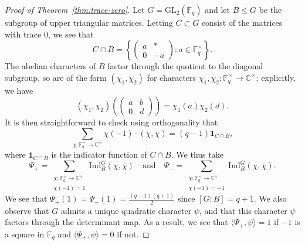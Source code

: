 \documentclass[12pt]{amsart}
\theoremstyle{definition} \newtheorem{definition}[theorem]{Definition}
\theoremstyle{example} \newtheorem{example}[theorem]{Example}
\theoremstyle{remark} \newtheorem{remark}{Remark}[theorem]
\numberwithin{equation}{section}
\numberwithin{theorem}{section}
\renewcommand{\leq}{\leqslant}
\begin{document}
	\begin{proof}[Proof of Theorem~\ref{thm:trace-zero}]
		Let $G = \mathrm{GL}_2(\mathbb{F}_q)$ and let $B \leq G$ be the subgroup of upper triangular matrices.  Letting $C \subset G$ consist of the matrices with trace $0$, we see that
			\[
				C \cap B = \left\{
				\begin{pmatrix}
					a & * \\ 0 & -a
				\end{pmatrix}
					: a \in \mathbb{F}_q^\times \right\}.
			\]
		The abelian characters of $B$ factor through the quotient to the diagonal subgroup, so are of the form $(\chi_1,\chi_2)$ for characters $\chi_1,\chi_2 \colon \mathbb{F}_q^\times \to \mathbb{C}^\times$; explicitly, we have 
			\[
				(\chi_1,\chi_2)\left(\begin{pmatrix} a & b \\ 0 & d \end{pmatrix}\right)
					= \chi_1(a) \chi_2(d).
			\]
		It is then straightforward to check using orthogonality that
			\[
				\sum_{\chi\colon \mathbb{F}_q^\times \to \mathbb{C}^\times} \chi(-1) \cdot (\chi, \overline{\chi})
					= (q-1) \mathbf{1}_{C \cap B},
			\]
		where $\mathbf{1}_{C \cap B}$ is the indicator function of $C \cap B$.  We thus take
			\[
				\Psi_+ = \sum_{\substack{ \chi\colon \mathbb{F}_q^\times \to \mathbb{C}^\times \\ \chi(-1) = 1}} \mathrm{Ind}_B^G (\chi,\overline{\chi}) 
					\quad \text{and} \quad
				\Psi_- = \sum_{\substack{ \chi\colon \mathbb{F}_q^\times \to \mathbb{C}^\times \\ \chi(-1) = -1}} \mathrm{Ind}_B^G (\chi,\overline{\chi}).
			\]
		We see that $\Psi_+(1) = \Psi_-(1) = \frac{(q-1)(q+1)}{2}$ since $[G:B] = q+1$.  We also observe that $G$ admits a unique quadratic character $\psi$, and that this character $\psi$ factors through the determinant map.  As a result, we see that $\langle \Psi_+,\psi \rangle = 1$ if $-1$ is a square in $\mathbb{F}_q$ and $\langle \Psi_+,\psi\rangle = 0$ if not.
		

\end{proof}
\end{document}
